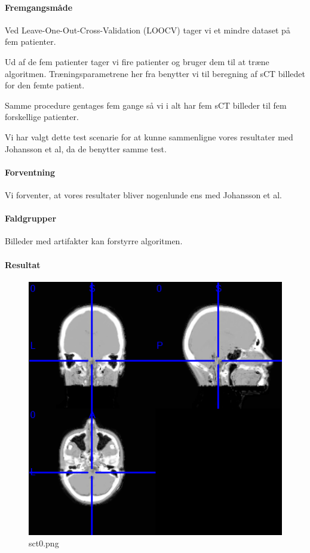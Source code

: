 \paragraph{Fremgangsmåde}
Ved Leave-One-Out-Cross-Validation (LOOCV) tager vi et mindre dataset på fem patienter.

Ud af de fem patienter tager vi fire patienter og bruger dem til at træne algoritmen. Træningsparametrene her fra benytter vi til beregning af sCT billedet for den femte patient.

Samme procedure gentages fem gange så vi i alt har fem sCT billeder til fem forskellige patienter.

Vi har valgt dette test scenarie for at kunne sammenligne vores resultater med Johansson et al, da de benytter samme test.


\paragraph{Forventning}
Vi forventer, at vores resultater bliver nogenlunde ens med Johansson et al.

\paragraph{Faldgrupper}
Billeder med artifakter kan forstyrre algoritmen. 

\paragraph{Resultat}

\begin{figure}
\includegraphics[width=\linewidth]{sct0.png}
\caption{sct0.png}
\end{figure}

